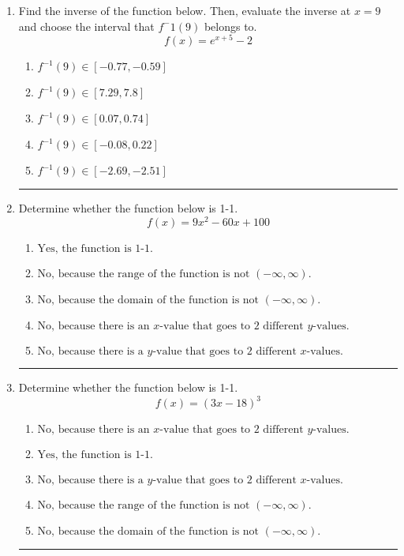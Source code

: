 \documentclass[14pt]{extbook}
\newcommand{\litem}[1]{\item#1\hspace*{-1cm}\rule{\textwidth}{0.4pt}}
\begin{document}
\begin{enumerate}
{\begin{enumerate}[label=\Alph*.]
\end{enumerate} }
\litem{
Find the inverse of the function below. Then, evaluate the inverse at $x = 9$ and choose the interval that $f^-1(9)$ belongs to.\[ f(x) = e^{x+5}-2 \]\begin{enumerate}[label=\Alph*.]
\item \( f^{-1}(9) \in [-0.77, -0.59] \)
\item \( f^{-1}(9) \in [7.29, 7.8] \)
\item \( f^{-1}(9) \in [0.07, 0.74] \)
\item \( f^{-1}(9) \in [-0.08, 0.22] \)
\item \( f^{-1}(9) \in [-2.69, -2.51] \)

\end{enumerate} }
\litem{
Determine whether the function below is 1-1.\[ f(x) = 9 x^2 - 60 x + 100 \]\begin{enumerate}[label=\Alph*.]
\item \( \text{Yes, the function is 1-1.} \)
\item \( \text{No, because the range of the function is not $(-\infty, \infty)$.} \)
\item \( \text{No, because the domain of the function is not $(-\infty, \infty)$.} \)
\item \( \text{No, because there is an $x$-value that goes to 2 different $y$-values.} \)
\item \( \text{No, because there is a $y$-value that goes to 2 different $x$-values.} \)

\end{enumerate} }
\litem{
Determine whether the function below is 1-1.\[ f(x) = (3 x - 18)^3 \]\begin{enumerate}[label=\Alph*.]
\item \( \text{No, because there is an $x$-value that goes to 2 different $y$-values.} \)
\item \( \text{Yes, the function is 1-1.} \)
\item \( \text{No, because there is a $y$-value that goes to 2 different $x$-values.} \)
\item \( \text{No, because the range of the function is not $(-\infty, \infty)$.} \)
\item \( \text{No, because the domain of the function is not $(-\infty, \infty)$.} \)


\end{enumerate}}
\end{enumerate}
\end{document}

